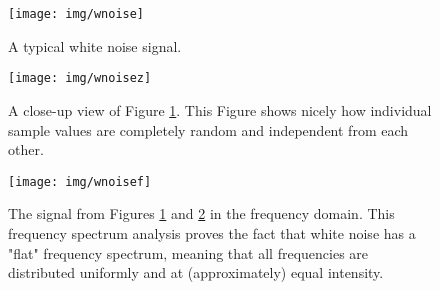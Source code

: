 \begin{figure}[p!]
	\texttt{[image: img/wnoise]}
	\caption{A typical white noise signal.}
	\label{fig:wnoise}
\end{figure}

\begin{figure}[p!]
	\texttt{[image: img/wnoisez]}
	\caption{A close-up view of Figure \ref{fig:wnoise}. This Figure shows nicely how individual sample values are completely random and independent from each other. }
	\label{fig:wnoisez}
\end{figure}

\begin{figure}[p!]
  \texttt{[image: img/wnoisef]}
  \caption{The signal from Figures \ref{fig:wnoise} and \ref{fig:wnoisez} in the frequency domain. This frequency spectrum analysis proves the fact that white noise has a "flat" frequency spectrum, meaning that all frequencies are  distributed uniformly and at (approximately) equal intensity. }
  \label{fig:wnoisefreq}
\end{figure}

\begin{table}[p!]
  \caption{A simple C++ class to produce white noise. \texttt{rgen\_} is a random number generator following the Mersenne-Twister algorithm, to retrieve uniformly distributed values from the \texttt{dist\_} distribution in the range of -1 to 1. \texttt{tick()} returns a random white noise sample. }
  \label{code:wnoise}
\end{table}
